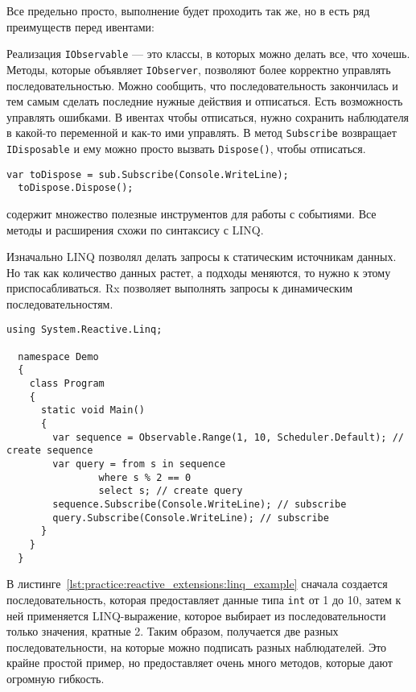 Все предельно просто, выполнение будет проходить так же, но в \rx{} есть ряд преимуществ перед ивентами:

Реализация \lstinline[style=csharpinlinestyle]!IObservable! --- это классы, в которых можно делать все, что хочешь. Методы, которые объявляет \lstinline[style=csharpinlinestyle]!IObserver!,
позволяют более корректно управлять последовательностью. Можно сообщить, что последовательность закончилась и тем самым сделать последние нужные действия и отписаться.
Есть возможность управлять ошибками. В ивентах чтобы отписаться, нужно сохранить наблюдателя в какой-то переменной и как-то ими управлять.
В \rx{} метод \lstinline[style=csharpinlinestyle]!Subscribe! возвращает \lstinline[style=csharpinlinestyle]!IDisposable! и ему можно просто вызвать \lstinline[style=csharpinlinestyle]!Dispose()!, чтобы отписаться.

\begin{lstlisting}[style=csharpinlinestyle, caption={Отписка от события}, label=lst:practice:reactive_extensions:dispose_example]
  var toDispose = sub.Subscribe(Console.WriteLine);
  toDispose.Dispose();
\end{lstlisting}

\rx{} содержит множество полезные инструментов для работы с событиями. Все методы и расширения схожи по синтаксису с LINQ.

Изначально LINQ позволял делать запросы к статическим источникам данных.
Но так как количество данных растет, а подходы меняются, то нужно к этому приспосабливаться. Rx позволяет выполнять запросы к динамическим последовательностям.

\begin{lstlisting}[style=csharpinlinestyle, caption={Пример использования LINQ}, label=lst:practice:reactive_extensions:linq_example]
  using System.Reactive.Linq;

  namespace Demo
  {
    class Program
    {
      static void Main()
      {
        var sequence = Observable.Range(1, 10, Scheduler.Default); // create sequence
        var query = from s in sequence
                where s % 2 == 0
                select s; // create query
        sequence.Subscribe(Console.WriteLine); // subscribe
        query.Subscribe(Console.WriteLine); // subscribe
      }
    }
  }
\end{lstlisting}

В листинге~\ref{lst:practice:reactive_extensions:linq_example} сначала создается последовательность, которая предоставляет данные типа \lstinline[style=csharpinlinestyle]!int! от 1 до 10,
затем к ней применяется LINQ-выражение, которое выбирает из последовательности только значения, кратные 2.
Таким образом, получается две разных последовательности, на которые можно подписать разных наблюдателей. Это крайне простой пример, но \rx{} предоставляет очень много методов, которые дают огромную гибкость.

